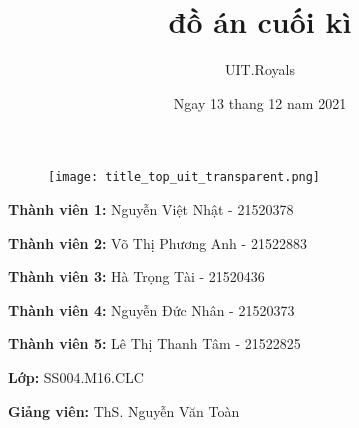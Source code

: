 \documentclass[paper=a4,fontsize=13pt]{report}
\title{đồ án cuối kì}
\author{UIT.Royals}
\date{Ngay 13 thang 12 nam 2021}
\begin{document}
\thispagestyle{empty}

\begin{figure}[h!]
    \texttt{[image: title\_top\_uit\_transparent.png]}
    \label{fig:logo_uit}
\end{figure}

\vspace{130px}

{}
\vspace{15pt}
{}
{}

\vspace{120px}

\Large{
    \hspace{50px} {\textbf{Thành viên 1: } Nguyễn Việt Nhật - 21520378}\par
    \hspace{50px} {\textbf{Thành viên 2: } Võ Thị Phương Anh - 21522883}\par
    \hspace{50px} {\textbf{Thành viên 3: } Hà Trọng Tài - 21520436}\par
    \hspace{50px} {\textbf{Thành viên 4: } Nguyễn Đức Nhân - 21520373}\par
    \hspace{50px} {\textbf{Thành viên 5: } Lê Thị Thanh Tâm - 21522825}\par
    \hspace{50px} {\textbf{Lớp: } SS004.M16.CLC}\par
    \hspace{50px} {\textbf{Giảng viên: } ThS. Nguyễn Văn Toàn}\par
}
\thispagestyle{empty}
\tableofcontents

\newpage
{}
\setcounter{page}{2}
\end{document}
